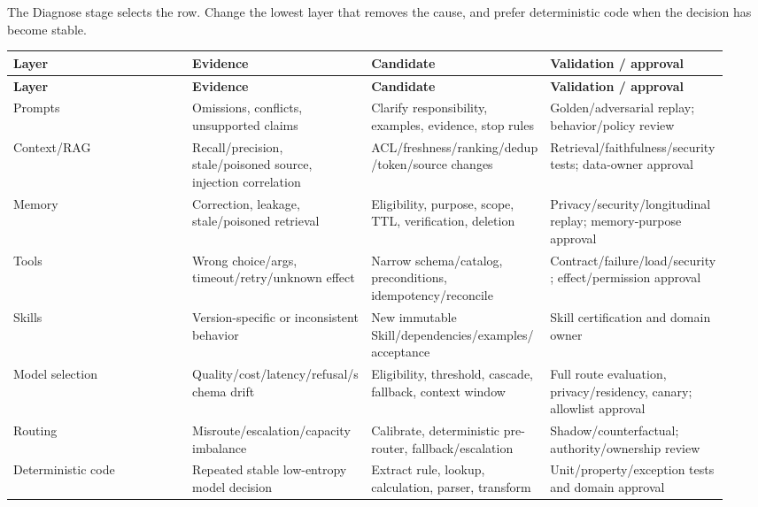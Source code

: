 The Diagnose stage selects the row. Change the lowest layer that removes the cause, and prefer deterministic code when the decision has become stable.\par

\BookTableStart
\fontsize{7.2}{9}\selectfont
\begin{longtable}{@{}Y{0.2350\linewidth}Y{0.2350\linewidth}Y{0.2350\linewidth}Y{0.2350\linewidth}@{}}
\color{white}\bfseries \textbf{Layer} & \color{white}\bfseries \textbf{Evidence} & \color{white}\bfseries \textbf{Candidate} & \color{white}\bfseries \textbf{Validation / approval} \\
\endfirsthead
{}
\color{white}\bfseries \textbf{Layer} & \color{white}\bfseries \textbf{Evidence} & \color{white}\bfseries \textbf{Candidate} & \color{white}\bfseries \textbf{Validation / approval} \\
\endhead
Prompts & Omissions, conflicts, unsupported claims & Clarify responsibility, examples, evidence, stop rules & Golden/adversarial replay; behavior/policy review \\
Context/RAG & Recall/precision, stale/poisoned source, injection correlation & ACL/freshness/ranking/dedup/token/source changes & Retrieval/faithfulness/security tests; data-owner approval \\
Memory & Correction, leakage, stale/poisoned retrieval & Eligibility, purpose, scope, TTL, verification, deletion & Privacy/security/longitudinal replay; memory-purpose approval \\
Tools & Wrong choice/args, timeout/retry/unknown effect & Narrow schema/catalog, preconditions, idempotency/reconcile & Contract/failure/load/security; effect/permission approval \\
Skills & Version-specific or inconsistent behavior & New immutable Skill/dependencies/examples/acceptance & Skill certification and domain owner \\
Model selection & Quality/cost/latency/refusal/schema drift & Eligibility, threshold, cascade, fallback, context window & Full route evaluation, privacy/residency, canary; allowlist approval \\
Routing & Misroute/escalation/capacity imbalance & Calibrate, deterministic pre-router, fallback/escalation & Shadow/counterfactual; authority/ownership review \\
Deterministic code & Repeated stable low-entropy model decision & Extract rule, lookup, calculation, parser, transform & Unit/property/exception tests and domain approval \\

\end{longtable}
